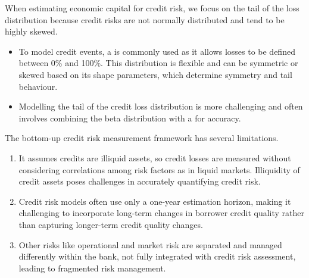 
When estimating economic capital for credit risk, we focus on the tail of the
loss distribution because credit risks are not normally distributed and tend to
be highly skewed.

\begin{itemize}
\item To model credit events, a  is commonly used as it
allows losses to be defined between 0\% and 100\%. This distribution is flexible
and can be symmetric or skewed based on its shape parameters, which determine
symmetry and tail behaviour.
\item Modelling the tail of the credit loss distribution is more challenging and
often involves combining the beta distribution with a  for accuracy.
\end{itemize}


The bottom-up credit risk measurement framework has several limitations.

\begin{enumerate}
\item {} It assumes credits are illiquid assets, so credit
losses are measured without considering correlations among risk factors as in
liquid markets. Illiquidity of credit assets poses challenges in accurately
quantifying credit risk.
\item {} Credit risk models often use only a one-year
estimation horizon, making it challenging to incorporate long-term changes in
borrower credit quality rather than capturing longer-term credit quality changes.
\item {} Other risks like operational and market risk are
separated and managed differently within the bank, not fully integrated with
credit risk assessment, leading to fragmented risk management.
\end{enumerate}
